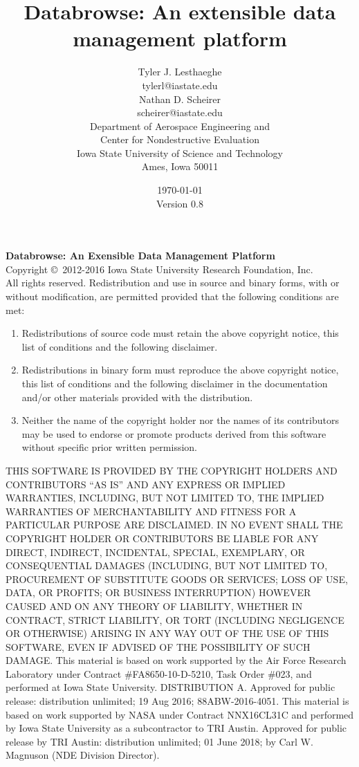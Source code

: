 \documentclass[10pt]{article}
\title{Databrowse: An extensible data management platform}
\author{
        Tyler J. Lesthaeghe \\
        tylerl@iastate.edu \\[1em]
        Nathan D. Scheirer \\
        scheirer@iastate.edu \\[1em]
                Department of Aerospace Engineering and\\
                Center for Nondestructive Evaluation\\
        Iowa State University of Science and Technology\\
        Ames, Iowa 50011\\
}
\date{\today \\
	Version 0.8}
\begin{document}
\maketitle

\clearpage
\noindent\textbf{Databrowse:  An Exensible Data Management Platform} \\
Copyright \copyright\ 2012-2016 Iowa State University Research Foundation, Inc. \\
All rights reserved.
\hfill\break
\hfill\break
Redistribution and use in source and binary forms, with or without modification, are permitted provided that the following conditions are met:
\begin{enumerate}
\item Redistributions of source code must retain the above copyright notice, this list of conditions and the following disclaimer.
\item Redistributions in binary form must reproduce the above copyright notice, this list of conditions and the following disclaimer in the documentation and/or other materials provided with the distribution.
\item Neither the name of the copyright holder nor the names of its contributors may be used to endorse or promote products derived from this software without specific prior written permission.
\end{enumerate}
THIS SOFTWARE IS PROVIDED BY THE COPYRIGHT HOLDERS AND CONTRIBUTORS ``AS IS'' AND ANY EXPRESS OR IMPLIED WARRANTIES, INCLUDING, BUT NOT LIMITED TO, THE IMPLIED WARRANTIES OF MERCHANTABILITY AND FITNESS FOR A PARTICULAR PURPOSE ARE DISCLAIMED. IN NO EVENT SHALL THE COPYRIGHT HOLDER OR CONTRIBUTORS BE LIABLE FOR ANY DIRECT, INDIRECT, INCIDENTAL, SPECIAL, EXEMPLARY, OR CONSEQUENTIAL DAMAGES (INCLUDING, BUT NOT LIMITED TO, PROCUREMENT OF SUBSTITUTE GOODS OR SERVICES; LOSS OF USE, DATA, OR PROFITS; OR BUSINESS INTERRUPTION) HOWEVER CAUSED AND ON ANY THEORY OF LIABILITY, WHETHER IN CONTRACT, STRICT LIABILITY, OR TORT (INCLUDING NEGLIGENCE OR OTHERWISE) ARISING IN ANY WAY OUT OF THE USE OF THIS SOFTWARE, EVEN IF ADVISED OF THE POSSIBILITY OF SUCH DAMAGE.
\hfill\break
\hfill\break
This material is based on work supported by the Air Force Research Laboratory under Contract \#FA8650-10-D-5210, Task Order \#023, and performed at Iowa State University.
\hfill\break
\hfill\break
DISTRIBUTION A.  Approved for public release:  distribution unlimited; 19 Aug 2016; 88ABW-2016-4051.
\hfill\break
\hfill\break
This material is based on work supported by NASA under Contract
NNX16CL31C and performed by Iowa State University as a subcontractor
to TRI Austin.
\hfill\break
\hfill\break
Approved for public release by TRI Austin: distribution unlimited;
01 June 2018; by Carl W. Magnuson (NDE Division Director).
\clearpage
\tableofcontents
\end{document}
